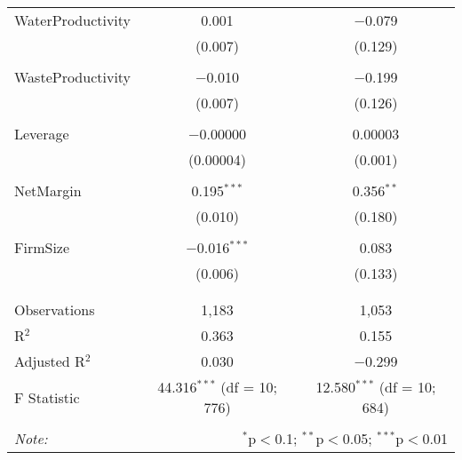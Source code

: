 \documentclass[]{article}
\begin{document}
\begin{table}[h]
\begin{tabular}{@{\extracolsep{5pt}}lcc}
 WaterProductivity & 0.001 & $-$0.079 \\ 
  & (0.007) & (0.129) \\ 
  & & \\ 
 WasteProductivity & $-$0.010 & $-$0.199 \\ 
  & (0.007) & (0.126) \\ 
  & & \\ 
 Leverage & $-$0.00000 & 0.00003 \\ 
  & (0.00004) & (0.001) \\ 
  & & \\ 
 NetMargin & 0.195$^{***}$ & 0.356$^{**}$ \\ 
  & (0.010) & (0.180) \\ 
  & & \\ 
 FirmSize & $-$0.016$^{***}$ & 0.083 \\ 
  & (0.006) & (0.133) \\ 
  & & \\ 
\hline \\[-1.8ex] 
Observations & 1,183 & 1,053 \\ 
R$^{2}$ & 0.363 & 0.155 \\ 
Adjusted R$^{2}$ & 0.030 & $-$0.299 \\ 
F Statistic & 44.316$^{***}$ (df = 10; 776) & 12.580$^{***}$ (df = 10; 684) \\ 
\hline 
\hline \\[-1.8ex] 
\textit{Note:}  & \multicolumn{2}{r}{$^{*}$p$<$0.1; $^{**}$p$<$0.05; $^{***}$p$<$0.01} \\ 
\end{tabular} 
\end{table}
\end{document}
